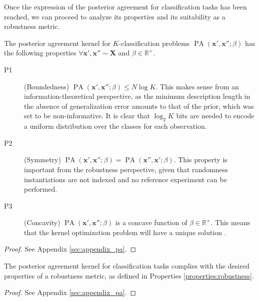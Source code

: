 Once the expression of the posterior agreement for classification tasks has been reached,
we can proceed to analyze its properties and its suitability as a robustness metric. 


\begin{theorem}\label{theorem:pa_properties}
    The posterior agreement kernel for $K$-classification problems $\operatorname{PA}\left(\bm{x}', \bm{x}'' ; \beta\right)$ 
    has the following properties $\forall \bm{x}', \bm{x}'' \sim \bm{X}$ and $\beta \in \mathbb{R}^+$.


    \begin{description}
        \item[P1](Boundedness) $\operatorname{PA}\left(\bm{x}', \bm{x}'' ; \beta\right) \leq N \log{K}$. This makes sense
        from an information-theoretical perspective, as the minimum description length in the absence of generalization error amounts
        to that of the prior, which was set to be non-informative. It is clear that $\log_2 K$ bits are needed to encode a uniform
        distribution over the classes for each observation.
        \item[P2](Symmetry)  $\operatorname{PA}\left(\bm{x}', \bm{x}'' ; \beta\right) = \operatorname{PA}\left(\bm{x}'', \bm{x}'; \beta\right)$. This property is 
        important from the robustness perspective, given that randomness instantiations
        are not indexed and no reference experiment can be performed.
        \item[P3](Concavity) $\operatorname{PA}\left(\bm{x}', \bm{x}'' ; \beta\right)$ is a concave function of $\beta \in \mathbb{R}^+$. This means that 
        the kernel optimization problem will have a unique solution
        \cite{boydConvexOptimization2004}.
    \end{description}
\end{theorem}

\begin{proof}
    See Appendix \ref{sec:appendix_pa}.
\end{proof}

\begin{theorem}
    The posterior agreement kernel for classification tasks complies with the desired 
    properties of a robustness metric, as defined in Properties \ref{properties:robustness}.
\end{theorem}
\begin{proof}
    See Appendix \ref{sec:appendix_pa}.
\end{proof}

